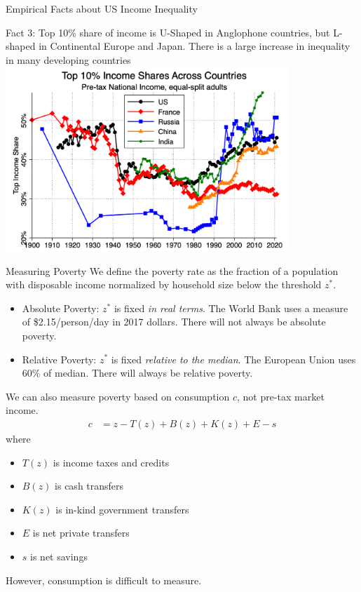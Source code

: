 \documentclass[8pt]{extarticle}
\begin{document}
\begin{problem}{Empirical Facts about US Income Inequality}
\begin{center}
    \end{center}
    \begin{center}
      Fact 3: Top 10\% share of income is U-Shaped in Anglophone countries, but L-shaped in Continental Europe and Japan. There is a large increase in inequality in many developing countries\\
      \includegraphics[width=0.8\textwidth]{images/country_inequality.png}
    \end{center}
  \end{problem}
  \begin{problem}{Measuring Poverty}
    We define the poverty rate as the fraction of a population with disposable income normalized by household size below the threshold $z^*$.
    \begin{itemize}
      \item Absolute Poverty: $z^*$ is fixed \textit{in real terms}. The World Bank uses a measure of \$2.15/person/day in 2017 dollars. There will not always be absolute poverty.
      \item Relative Poverty: $z^*$ is fixed \textit{relative to the median}. The European Union uses 60\% of median. There will always be relative poverty.
    \end{itemize}
    We can also measure poverty based on consumption $c$, not pre-tax market income.
    \begin{align*}
      c &= z - T(z) + B(z) + K(z) + E - s
    \end{align*}
    where
    \begin{itemize}
      \item $T(z)$ is income taxes and credits
      \item $B(z)$ is cash transfers
      \item $K(z)$ is in-kind government transfers
      \item $E$ is net private transfers
      \item $s$ is net savings
    \end{itemize}
    However, consumption is difficult to measure.
  \end{problem}
\end{document}
